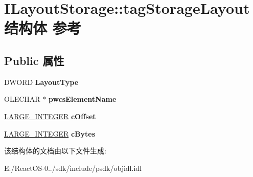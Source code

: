 \hypertarget{struct_i_layout_storage_1_1tag_storage_layout}{}\section{I\+Layout\+Storage\+:\+:tag\+Storage\+Layout结构体 参考}
\label{struct_i_layout_storage_1_1tag_storage_layout}
\subsection*{Public 属性}
\begin{DoxyCompactItemize}
\item 
\mbox{\label{struct_i_layout_storage_1_1tag_storage_layout_acf0192e4ba08f7f2e5171d6b89c8ed33}} 
D\+W\+O\+RD {\bfseries Layout\+Type}
\item 
\mbox{\label{struct_i_layout_storage_1_1tag_storage_layout_a3b37fff6e0f7be654939a71ac03ff177}} 
O\+L\+E\+C\+H\+AR $\ast$ {\bfseries pwcs\+Element\+Name}
\item 
\mbox{\label{struct_i_layout_storage_1_1tag_storage_layout_a2064c987bf6dfe3bc139dc95ac53c1e8}} 
\hyperlink{union___l_a_r_g_e___i_n_t_e_g_e_r}{L\+A\+R\+G\+E\+\_\+\+I\+N\+T\+E\+G\+ER} {\bfseries c\+Offset}
\item 
\mbox{\label{struct_i_layout_storage_1_1tag_storage_layout_af86ebc9b36958324a399800bea581d74}} 
\hyperlink{union___l_a_r_g_e___i_n_t_e_g_e_r}{L\+A\+R\+G\+E\+\_\+\+I\+N\+T\+E\+G\+ER} {\bfseries c\+Bytes}
\end{DoxyCompactItemize}


该结构体的文档由以下文件生成\+:\begin{DoxyCompactItemize}
\item 
E\+:/\+React\+O\+S-\/0../sdk/include/psdk/objidl.\+idl\end{DoxyCompactItemize}
